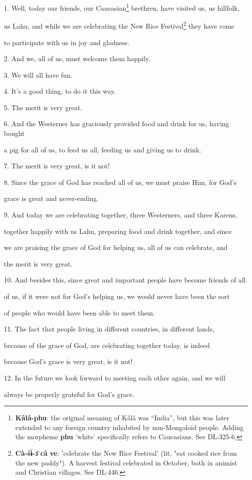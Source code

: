 \setcounter{footnote}{0}

1. Well, today our friends, our Caucasian\footnote{\textbf{Kâlâ-phu}: the original meaning of Kâlâ was ``India'', but this was later extended to any foreign country inhabited by non-Mongoloid people. Adding the morpheme \textbf{phu} 'white' specifically refers to Caucasians. See DL:325-6.} brethren, have visited us, us hillfolk,


us Lahu, and while we are celebrating the New Rice Festival\footnote{\textbf{Cà-šɨ́-ɔ̄} \textbf{câ} \textbf{ve}: 'celebrate the New Rice Festival' (lit. "eat cooked rice from the new paddy"). A harvest festival celebrated in October, both in animist and Christian villages. See DL:446.} they have come

to participate with us in joy and gladness.

2. And we, all of us, must welcome them happily.

3. We will all have fun.

4. It's a good thing, to do it this way.

5. The merit is very great.

6. And the Westerner has graciously provided food and drink for us, having bought


a pig for all of us, to feed us all, feeding us and giving us to drink.

7. The merit is very great, is it not!

8. Since the grace of God has reached all of us, we must praise Him, for God's


grace is great and never-ending.

9. And today we are celebrating together, three Westerners, and three Karens,


together happily with us Lahu, preparing food and drink together, and since

we are praising the grace of God for helping us, all of us can celebrate, and


the merit is very great.

10. And besides this, since great and important people have become friends of all


of us, if it were not for God's helping us, we would never have been the sort


of people who would have been able to meet them.

11. The fact that people living in different countries, in different lands,


because of the grace of God, are celebrating together today, is indeed


because God's grace is very great, is it not!

12. In the future we look forward to meeting each other again, and we will


always be properly grateful for God's grace.

